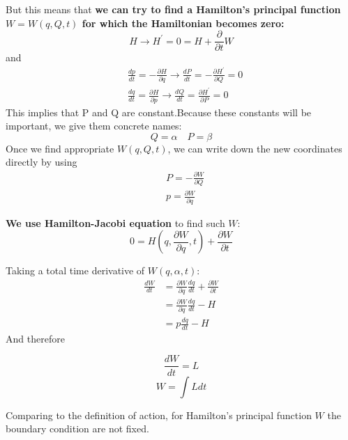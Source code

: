 But this means that \textbf{we can try to find a\textbf{ Hamilton's principal function} $W=W(q, Q, t)$ for which the Hamiltonian becomes zero:}
\begin{equation}
H \rightarrow H^{\prime}=0=H+\frac{\partial}{\partial t} W
\end{equation}
and
\begin{equation}
\begin{aligned}
&\frac{d p}{d t}=-\frac{\partial H}{\partial q} \rightarrow \frac{d P}{d t}=-\frac{\partial H^{\prime}}{\partial Q} = 0\\
&\frac{d q}{d t}=\frac{\partial H}{\partial p} \rightarrow \frac{d Q}{d t}=\frac{\partial H^{\prime}}{\partial P} = 0
\end{aligned}
\end{equation}
This implies that P and Q are constant.Because these constants will be important, we give them concrete names:
\begin{equation}
Q=\alpha \quad P=\beta
\end{equation}
Once we find appropriate $W(q,Q,t)$, we can write down the new coordinates directly by using
\begin{equation}
\begin{aligned}
&P=-\frac{\partial W}{\partial Q}\\
&p=\frac{\partial W}{\partial q}
\end{aligned}
\end{equation}
\begin{qt}
\textbf{We use Hamilton-Jacobi equation} to find such $W$:
\begin{equation}
0=H\left(q, \frac{\partial W}{\partial q}, t\right)+\frac{\partial W}{\partial t}
\label{hamil-jacob}
\end{equation}
\end{qt}
Taking a total time derivative of $W(q,\alpha,t)$:
\begin{equation}
\begin{aligned}
\frac{d W}{d t} &=\frac{\partial W}{\partial q} \frac{d q}{d t}+\frac{\partial W}{\partial t} \\
&=\frac{\partial W}{\partial q} \frac{d q}{d t}-H \\
&=p \frac{d q}{d t}-H
\end{aligned}
\end{equation}
And therefore
\begin{qt}
\begin{equation}
\frac{d W}{d t}=L
\end{equation}
\begin{equation}
W=\int L d t
\end{equation}
\end{qt}
Comparing to the definition of action, for Hamilton's principal function $W$ the boundary condition are not fixed.

